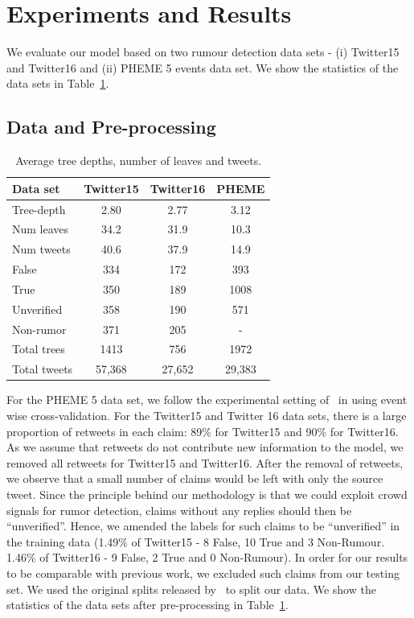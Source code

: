 \documentclass[letterpaper]{article} %
\begin{document}
\section{Experiments and Results}

We evaluate our model based on two rumour detection data sets - (i) Twitter15 and Twitter16 and (ii) PHEME 5 events data set. We show the statistics of the data sets in Table~\ref{tab:data_tree_analysis}. 

\subsection{Data and Pre-processing} \label{data_pre_processing}

\begin{table}
\centering
\small
\begin{tabular}{lccc} \toprule
Data set    & Twitter15 & Twitter16 & PHEME \\ \midrule
Tree-depth  & 2.80      & 2.77      & 3.12  \\
Num leaves  & 34.2      & 31.9      & 10.3  \\
Num tweets  & 40.6      & 37.9      & 14.9  \\ 
False       & 334       & 172       & 393 \\
True        & 350       & 189       & 1008 \\
Unverified  & 358       & 190       & 571 \\
Non-rumor   & 371       & 205       & - \\
Total trees & 1413      & 756       & 1972 \\
Total tweets& 57,368    & 27,652    & 29,383\\
\bottomrule
\end{tabular}
\caption{Average tree depths, number of leaves and tweets.}
\label{tab:data_tree_analysis}
\end{table}

For the PHEME 5 data set, we follow the experimental setting of~\citet{kumar19} in using event wise cross-validation.
For the Twitter15 and Twitter 16 data sets, there is a large proportion of retweets in each claim: 89\% for Twitter15 and 90\% for Twitter16. As we assume that retweets do not contribute new information to the model, we removed all retweets for Twitter15 and Twitter16. After the removal of retweets, we observe that a small number of claims would be left with only the source tweet. Since the principle behind our methodology is that we could exploit crowd signals for rumor detection, claims without any replies should then be ``unverified''. Hence, we amended the labels for such claims to be ``unverified'' in the training data (1.49\% of Twitter15 - 8 False, 10 True and 3 Non-Rumour. 1.46\% of Twitter16 - 9 False, 2 True and 0 Non-Rumour). In order for our results to be comparable with previous work, we excluded such claims from our testing set. We used the original splits released by~\cite{ma18} to split our data.  
We show the statistics of the data sets after pre-processing in Table~\ref{tab:data_tree_analysis}.
\end{document}
